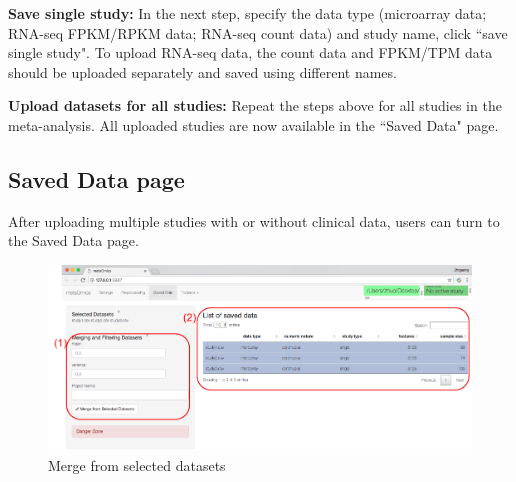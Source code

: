 \begin{steps}
\item \textbf{Save single study:}
In the next step,
specify the data type (microarray data; RNA-seq FPKM/RPKM data; RNA-seq count data) and study name,
click ``save single study".
To upload RNA-seq data, the count data and FPKM/TPM
 data should be uploaded separately and saved using different names.

\item \textbf{Upload datasets for all studies:}
Repeat the steps above for all studies in the meta-analysis.
All uploaded studies are now available in the ``Saved Data" page. 
 
\end{steps}

\subsection{Saved Data page}
\label{sec:saved}

After uploading multiple studies with or without clinical data,
users can turn to the Saved Data page.

\begin{figure}[H]
\begin{center}
\includegraphics[scale=1]{./figure/preprocessing/GUImerge.pdf}
\caption{Merge from selected datasets}
\label{fig:GUImerge}
\end{center}
\end{figure}


